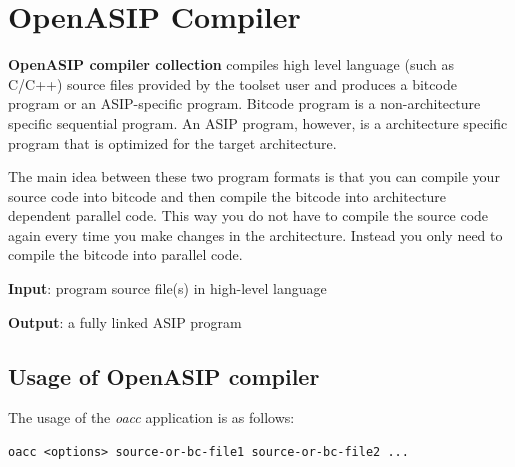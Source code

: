 \documentclass[a4paper,twoside]{tceusermanual}
\begin{document}
\section{OpenASIP Compiler}
\label{sec:frontend}

\textbf{OpenASIP compiler collection} compiles high level language (such as
C/C++) source files provided by the toolset user and produces a bitcode
program or an ASIP-specific program. Bitcode program is a non-architecture
specific sequential program. An ASIP program, however, is
a architecture specific program that is optimized for the target architecture.

The main idea between these two program formats is that you can compile your
source code into bitcode and then compile the bitcode into architecture
dependent parallel code. This way you do not have to compile the source code
again every time you make changes in the architecture. Instead you only need
to compile the bitcode into parallel code.

\textbf{Input}: program source file(s) in high-level language

\textbf{Output}: a fully linked ASIP program

\subsection{Usage of OpenASIP compiler}

The usage of the \emph{oacc} application is as follows:

\begin{verbatim}
oacc <options> source-or-bc-file1 source-or-bc-file2 ...
\end{verbatim}
\end{document}

